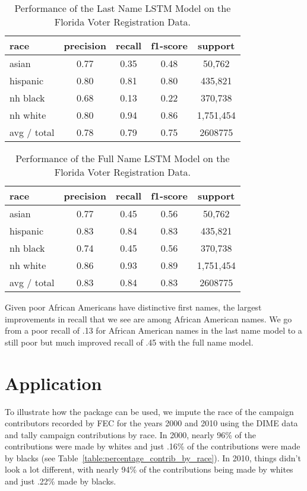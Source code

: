 \documentclass[12pt, letterpaper]{article}
\begin{document}
\begin{table}[h!]
\centering
\caption{Performance of the Last Name LSTM Model on the Florida Voter Registration Data.}
\begin{tabular}{ l c c c c }
\hline	
    race & precision & recall & f1-score & support \\
\hline
   asian & 0.77 & 0.35 & 0.48 & 50,762 \\
   hispanic &  0.80 & 0.81 & 0.80 & 435,821 \\
   nh black & 0.68 & 0.13 & 0.22 & 370,738 \\
   nh white & 0.80 & 0.94 & 0.86 & 1,751,454 \\
avg / total     &    0.78 & 0.79  &  0.75 & 2608775 \\
\hline
\end{tabular}
\label{table:2}
\end{table}

\begin{table}[h!]
\centering
\caption{Performance of the Full Name LSTM Model on the Florida Voter Registration Data.}
\begin{tabular}{ l c c c c }
\hline	
   race & precision & recall & f1-score & support\\
\hline
   asian & 0.77  & 0.45 & 0.56   &    50,762\\
   hispanic  &  0.83 & 0.84 & 0.83  &    435,821\\
   nh black &  0.74 &  0.45 & 0.56  &    370,738\\
   nh white  & 0.86  & 0.93 & 0.89  &   1,751,454\\

avg / total     &    0.83    &    0.84    &    0.83  &   2608775\\
\hline
\end{tabular}
\label{table:3}
\end{table}

Given poor African Americans have distinctive first names, the largest improvements in recall that we see are among African American names. We go from a poor recall of .13 for African American names in the last name model to a still poor but much improved recall of .45 with the full name model.

\section*{Application}
To illustrate how the package can be used, we impute the race of the campaign contributors recorded by FEC for the years 2000 and 2010 using the DIME data \citep{bonica2017database} and tally campaign contributions by race. In 2000, nearly 96\% of the contributions were made by whites and just .16\% of the contributions were made by blacks (see Table~\ref{table:percentage_contrib_by_race}). In 2010, things didn't look a lot different, with nearly 94\% of the contributions being made by whites and just .22\% made by blacks.
\end{document}
